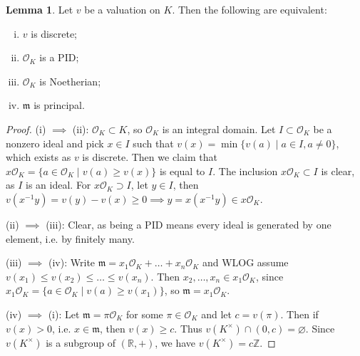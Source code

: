 \documentclass{article}
\theoremstyle{definition}
\newtheorem{lemma}[theorem]{Lemma}
\begin{document}
\begin{lemma}
    Let $v$ be a valuation on $K$. Then the following are equivalent:
    \begin{enumerate}[(i)]
        \item $v$ is discrete;
        \item $\mathcal{O}_K$ is a PID;
        \item $\mathcal{O}_K$ is Noetherian;
        \item $\mathfrak{m}$ is principal.
    \end{enumerate}
\end{lemma}
\begin{proof}
    (i) $\implies$ (ii): $\mathcal{O}_K \subset K$, so $\mathcal{O}_K$ is an integral domain. Let $I \subset \mathcal{O}_K$ be a nonzero ideal and pick $x \in I$ such that $v(x) = \min \{v(a) \mid a \in I, a \neq 0\}$, which exists as $v$ is discrete. Then we claim that $x \mathcal{O}_K = \{a \in \mathcal{O}_K \mid v(a)\ge v(x)\}$ is equal to $I$. The inclusion $x\mathcal{O}_K\subset I$ is clear, as $I$ is an ideal. For $x\mathcal{O}_K\supset I$, let $y \in I$, then $v(x^{-1}y) = v(y) - v(x) \ge 0 \implies y = x(x^{-1}y) \in x \mathcal{O}_K$.
    \vspace{1mm}
     
    (ii) $\implies $ (iii): Clear, as being a PID means every ideal is generated by one element, i.e. by finitely many. 
    \vspace{1mm}
     
    (iii) $\implies $ (iv): Write $\mathfrak{m} = x_1 \mathcal{O}_K +\ldots+ x_n \mathcal{O}_K$ and WLOG assume $v(x_1)\le v(x_2)\le \ldots\le v(x_n)$. Then $x_2,\ldots,x_n \in x_1 \mathcal{O}_K$, since $x_1 \mathcal{O}_K = \{a \in \mathcal{O}_K \mid v(a) \ge v(x_1)\}$, so $\mathfrak{m} = x_1 \mathcal{O}_K$.
    \vspace{1mm}
     
    (iv) $\implies $ (i): Let $\mathfrak{m} = \pi \mathcal{O}_K$ for some $\pi \in \mathcal{O}_K$ and let $c = v(\pi)$. Then if $v(x)>0$, i.e. $x \in \mathfrak{m}$, then $v(x) \ge c$. Thus $v(K^\times) \cap (0,c) = \varnothing$. Since $v(K^\times)$ is a subgroup of $(\mathbb{R}, +)$, we have $v(K^{\times}) = c\mathbb{Z}$.
\end{proof}
\end{document}
